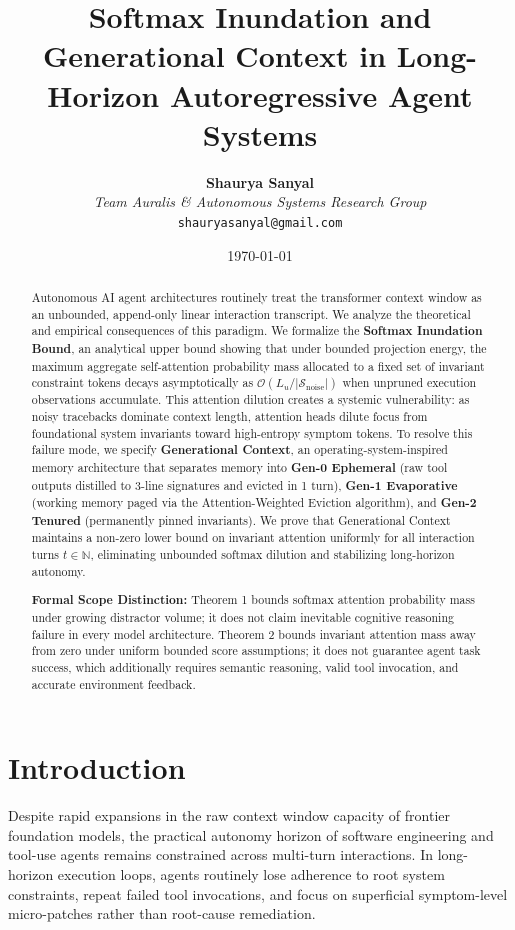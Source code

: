 \documentclass[11pt,a4paper]{article}
\title{\Huge \bf Softmax Inundation and Generational Context in Long-Horizon Autoregressive Agent Systems}
\author{\textbf{Shaurya Sanyal} \\ \textit{Team Auralis \& Autonomous Systems Research Group} \\ \texttt{shauryasanyal@gmail.com}}
\date{\today}
\begin{document}
\maketitle

\begin{abstract}
\noindent Autonomous AI agent architectures routinely treat the transformer context window as an unbounded, append-only linear interaction transcript. We analyze the theoretical and empirical consequences of this paradigm. We formalize the \textbf{Softmax Inundation Bound}, an analytical upper bound showing that under bounded projection energy, the maximum aggregate self-attention probability mass allocated to a fixed set of invariant constraint tokens decays asymptotically as $\mathcal{O}(L_u / |\mathcal{S}_{\text{noise}}|)$ when unpruned execution observations accumulate. This attention dilution creates a systemic vulnerability: as noisy tracebacks dominate context length, attention heads dilute focus from foundational system invariants toward high-entropy symptom tokens. To resolve this failure mode, we specify \textbf{Generational Context}, an operating-system-inspired memory architecture that separates memory into \textbf{Gen-0 Ephemeral} (raw tool outputs distilled to 3-line signatures and evicted in 1 turn), \textbf{Gen-1 Evaporative} (working memory paged via the Attention-Weighted Eviction algorithm), and \textbf{Gen-2 Tenured} (permanently pinned invariants). We prove that Generational Context maintains a non-zero lower bound on invariant attention uniformly for all interaction turns $t \in \mathbb{N}$, eliminating unbounded softmax dilution and stabilizing long-horizon autonomy.

\vspace{0.5em}
\noindent \textbf{Formal Scope Distinction:} Theorem 1 bounds softmax attention probability mass under growing distractor volume; it does not claim inevitable cognitive reasoning failure in every model architecture. Theorem 2 bounds invariant attention mass away from zero under uniform bounded score assumptions; it does not guarantee agent task success, which additionally requires semantic reasoning, valid tool invocation, and accurate environment feedback.
\end{abstract}

\section{Introduction}
\label{sec:intro}
Despite rapid expansions in the raw context window capacity of frontier foundation models, the practical autonomy horizon of software engineering and tool-use agents remains constrained across multi-turn interactions. In long-horizon execution loops, agents routinely lose adherence to root system constraints, repeat failed tool invocations, and focus on superficial symptom-level micro-patches rather than root-cause remediation.
\end{document}
